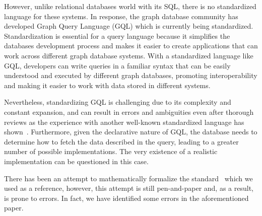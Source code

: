 \documentclass[14pt]{constructor-thesis}
\theoremstyle{definition}
\begin{document}
However, unlike relational databases world with its SQL, there is no standardized language for these systems. In response, the graph database community has developed Graph Query Language (GQL) which is currently being standardized. Standardization is essential for a query language because it simplifies the databases development process and makes it easier to create applications that can work across different graph database systems. With a standardized language like GQL, developers can write queries in a familiar syntax that can be easily understood and executed by different graph databases, promoting interoperability and making it easier to work with data stored in different systems.

Nevertheless, standardizing GQL is challenging due to its complexity and constant expansion, and can result in errors and ambiguities even after thorough reviews as the experience with another well-known standardized language has shown~\cite{cpp-std-verified}. Furthermore, given the declarative nature of GQL, the database needs to determine how to fetch the data described in the query, leading to a greater number of possible implementations. The very existence of a realistic implementation can be questioned in this case.

There has been an attempt to mathematically formalize the standard~\cite{GQL-formalized-on-paper} which we used as a reference, however, this attempt is still pen-and-paper and, as a result, is prone to errors. In fact, we have identified some errors in the aforementioned paper.



\end{document}
